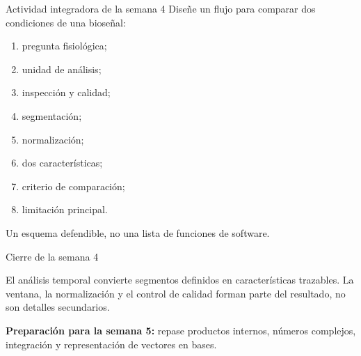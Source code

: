 \documentclass[
  ignorenonframetext,
  aspectratio=169,
  spanish,
  professionalfonts]{beamer}
\providecommand{\tightlist}{%
  \setlength{\itemsep}{0pt}\setlength{\parskip}{0pt}}
\begin{document}
\begin{frame}{Actividad integradora de la semana 4}
\protect{}\label{actividad-integradora-de-la-semana-4}
Diseñe un flujo para comparar dos condiciones de una bioseñal:

\begin{enumerate}
\tightlist
\item
  pregunta fisiológica;
\item
  unidad de análisis;
\item
  inspección y calidad;
\item
  segmentación;
\item
  normalización;
\item
  dos características;
\item
  criterio de comparación;
\item
  limitación principal.
\end{enumerate}

\begin{tcolorbox}[enhanced jigsaw, arc=.35mm, bottomrule=.15mm, bottomtitle=1mm, breakable, colback=white, colbacktitle=quarto-callout-tip-color!10!white, colframe=quarto-callout-tip-color-frame, coltitle=black, left=2mm, leftrule=.75mm, opacityback=0, opacitybacktitle=0.6, rightrule=.15mm, title={Producto esperado}, titlerule=0mm, toprule=.15mm, toptitle=1mm]

Un esquema defendible, no una lista de funciones de software.

\end{tcolorbox}
\end{frame}

\begin{frame}{Cierre de la semana 4}
\protect{}\label{cierre-de-la-semana-4}
\begin{tcolorbox}[enhanced jigsaw, arc=.35mm, bottomrule=.15mm, bottomtitle=1mm, breakable, colback=white, colbacktitle=quarto-callout-important-color!10!white, colframe=quarto-callout-important-color-frame, coltitle=black, left=2mm, leftrule=.75mm, opacityback=0, opacitybacktitle=0.6, rightrule=.15mm, title={Síntesis}, titlerule=0mm, toprule=.15mm, toptitle=1mm]

El análisis temporal convierte segmentos definidos en características
trazables. La ventana, la normalización y el control de calidad forman
parte del resultado, no son detalles secundarios.

\end{tcolorbox}

\textbf{Preparación para la semana 5:} repase productos internos,
números complejos, integración y representación de vectores en bases.
\end{frame}
\end{document}
